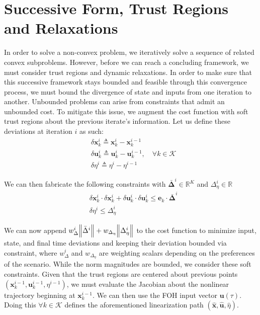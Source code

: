 \section{Successive Form, Trust Regions and Relaxations}
In order to solve a non-convex problem, we iteratively solve a sequence of related convex subproblems. However, before we can reach a concluding framework, we must consider trust regions and dynamic relaxations. In order to make sure that this successive framework stays bounded and feasible through this convergence process, we must bound the divergence of state and inputs from one iteration to another. Unbounded problems can arise from constraints that admit an unbounded cost. To mitigate this issue, we augment the cost function with soft trust regions about the previous iterate's information. Let us define these deviations at iteration $i$ as such:
\begin{align}
& \delta \mathbf{x}_k^i \triangleq \mathbf{x}_k^i - \mathbf{x}_k^{i-1} \\
& \delta \mathbf{u}_k^i \triangleq \mathbf{u}_k^i - \mathbf{u}_k^{i-1}, \quad \forall k \in \mathcal{K}\\
& \delta \eta^i \triangleq \eta^i - \eta^{i-1}
\end{align}

We can then fabricate the following constraints with $\bm{\bar{\Delta}}^i \in \mathbb{R}^K$ and $\Delta_\eta^i \in \mathbb{R}$
\begin{align}
& \delta \mathbf{x}_k^i \cdot \delta \mathbf{x}_k^i + \delta \mathbf{u}_k^i \cdot \delta \mathbf{u}_k^i \leq \mathbf{e}_k \cdot \bm{\bar{\Delta}}^i \\
& \delta \eta^i \leq \Delta_\eta^i
\end{align}

We can now append $w_\Delta^i \norm{{\bar{\Delta}}^i} + w_{\Delta_\eta}\norm{\Delta_\eta^i}$ to the cost function to minimize input, state, and final time deviations and keeping their deviation bounded via constraint, where $w_\Delta^i$ and $w_{\Delta_\eta}$ are weighting scalars depending on the preferences of the scenario. While the norm magnitudes are bounded, we consider these soft constraints.
Given that the trust regions are centered about previous points $(\mathbf{x}_{k}^{i-1},\mathbf{u}_{k}^{i-1},\eta^{i-1})$, we must evaluate the Jacobian about the nonlinear trajectory beginning at $\mathbf{x}_{k}^{i-1}$. We can then use the FOH input vector $\mathbf{u}(\tau)$. Doing this $\forall k \in \mathcal{K}$ defines the aforementioned linearization path $(\hat{\mathbf{x}}, \hat{\mathbf{u}}, \hat{\eta})$. 


